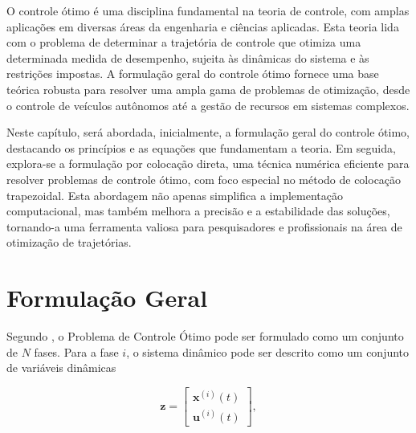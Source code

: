 
O controle ótimo é uma disciplina fundamental na teoria de controle, com amplas aplicações em diversas áreas da engenharia e ciências aplicadas. Esta teoria lida com o problema de determinar a trajetória de controle que otimiza uma determinada medida de desempenho, sujeita às dinâmicas do sistema e às restrições impostas. A formulação geral do controle ótimo fornece uma base teórica robusta para resolver uma ampla gama de problemas de otimização, desde o controle de veículos autônomos até a gestão de recursos em sistemas complexos.

Neste capítulo, será abordada, inicialmente, a formulação geral do controle ótimo, destacando os princípios e as equações que fundamentam a teoria. Em seguida, explora-se a formulação por colocação direta, uma técnica numérica eficiente para resolver problemas de controle ótimo, com foco especial no método de colocação trapezoidal. Esta abordagem não apenas simplifica a implementação computacional, mas também melhora a precisão e a estabilidade das soluções, tornando-a uma ferramenta valiosa para pesquisadores e profissionais na área de otimização de trajetórias.

\section{Formulação Geral}
\label{sec:formulação-geral}

Segundo \cite{betts_practical_2010}, o Problema de Controle Ótimo pode ser formulado como um conjunto de $N$ fases. Para a fase $i$, o sistema dinâmico pode ser descrito como um conjunto de variáveis dinâmicas

\begin{equation*}
    \mathbf{z} = \left[
        \begin{aligned}
            \mathbf{x}^{(i)}(t) \\
            \mathbf{u}^{(i)}(t)
        \end{aligned}
    \right],
\end{equation*}

